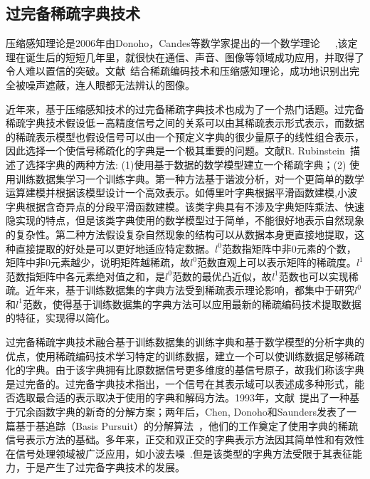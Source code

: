 \subsection{过完备稀疏字典技术}
\label{sec:overcompleteDictionaries}

压缩感知理论是2006年由Donoho，Candes等数学家提出的一个数学理论~\cite{candes2006near}~\cite{donoho2006compressed}~\cite{candes2008introduction},该定理在诞生后的短短几年里，就很快在通信、声音、图像等领域成功应用，并取得了令人难以置信的突破。文献~\cite{kroeker2009face}结合稀疏编码技术和压缩感知理论，成功地识别出完全被噪声遮蔽，连人眼都无法辨认的图像。

近年来，基于压缩感知技术的过完备稀疏字典技术也成为了一个热门话题。过完备稀疏字典技术假设低－高精度信号之间的关系可以由其稀疏表示形式表示，而数据的稀疏表示模型也假设信号可以由一个预定义字典的很少量原子的线性组合表示，因此选择一个使信号稀疏化的字典是一个极其重要的问题。文献R. Rubinstein~\cite{rubinstein2010dictionaries}描述了选择字典的两种方法: (1)使用基于数据的数学模型建立一个稀疏字典；(2) 使用训练数据集学习一个训练字典。第一种方法基于谐波分析，对一个更简单的数学运算建模并根据该模型设计一个高效表示。如傅里叶字典根据平滑函数建模,小波字典根据含奇异点的分段平滑函数建模。该类字典具有不涉及字典矩阵乘法、快速隐实现的特点，但是该类字典使用的数学模型过于简单，不能很好地表示自然现象的复杂性。第二种方法假设复杂自然现象的结构可以从数据本身更直接地提取，这种直接提取的好处是可以更好地适应特定数据。\(l^0\)范数指矩阵中非0元素的个数，矩阵中非0元素越少，说明矩阵越稀疏，故\(l^0\)范数直观上可以表示矩阵的稀疏度。\(l^1\)范数指矩阵中各元素绝对值之和，是\(l^0\)范数的最优凸近似，故\(l^1\)范数也可以实现稀疏。近年来，基于训练数据集的字典方法受到稀疏表示理论影响，都集中于研究\(l^0\)和\(l^1\)范数，使得基于训练数据集的字典方法可以应用最新的稀疏编码技术提取数据的特征，实现得以简化。

过完备稀疏字典技术融合基于训练数据集的训练字典和基于数学模型的分析字典的优点，使用稀疏编码技术学习特定的训练数据，建立一个可以使训练数据足够稀疏化的字典。由于该字典拥有比原数据信号更多维度的基信号原子，故我们称该字典是过完备的。过完备字典技术指出，一个信号在其表示域可以表述成多种形式，能否选取最合适的表示取决于使用的字典和解码方法。1993年，文献~\cite{mallat1993matching}提出了一种基于冗余函数字典的新奇的分解方案；两年后，Chen, Donoho和Saunders发表了一篇基于基追踪（Basis Pursuit）的分解算法~\cite{chen1998atomic}，他们的工作奠定了使用字典的稀疏信号表示方法的基础。多年来，正交和双正交的字典表示方法因其简单性和有效性在信号处理领域被广泛应用，如小波去噪~\cite{donoho1995noising}.但是该类型的字典方法受限于其表征能力，于是产生了过完备字典技术的发展。

